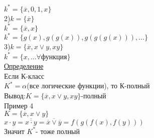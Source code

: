 \documentclass{article}
\begin{document}
$k^*=\{\overline{x},0,1,x \}$\\
2)$k=\{\overline{x}\}$\\
$k^*=\{\overline{x},x\}$\\
$k^*=\{g(x),g(g(x)),g(g(g(x))),\dots\}$\\
3)$k=\{\overline{x},x\vee y,xy \}$\\
$k^*=\{ x,\dots \forall $функция$\}$\\
\underline{Определение}\\
Если К-класс\\
$K^*=\alpha$(все логические функции), то К-полный\\
Вывод:$K=\{\overline{x},x\vee y,xy \}$-полный\\
Пример 4\\
$K=\{\overline{x},x\vee y \}$\\
$x\cdot y=\overline{\overline{x\cdot y}}=\overline{\overline{x}\vee \overline{y}}=f(g(f(x),f(y)))$\\
Значит $K^*$- тоже полный
\end{document}
